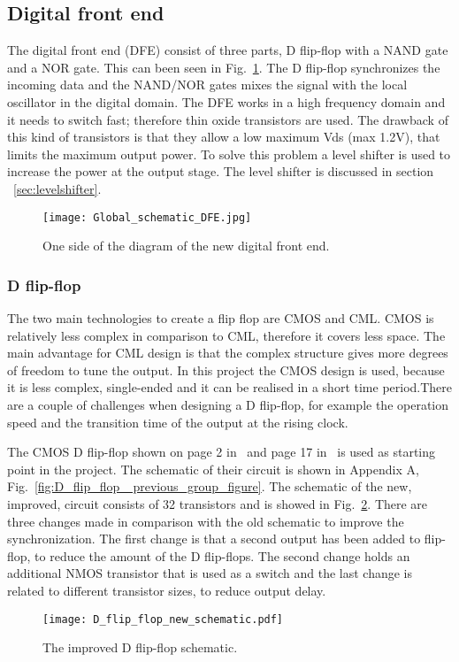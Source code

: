 \makeatletter
\newcommand*{\textoverline}[1]{$\overline{\hbox{#1}}\m@th$}
\makeatother

\subsection{Digital front end}\label{sec:frontend}
The digital front end (DFE) consist of three parts, D flip-flop with a NAND gate and a NOR gate. This can been seen in Fig.~\ref{fig:Global_schematic_DFE_figure}. The D flip-flop synchronizes the incoming data and the NAND/NOR gates mixes the signal with the local oscillator in the digital domain. The DFE works in a high frequency domain and it needs to switch fast; therefore thin oxide transistors are used. The drawback of this kind of transistors is that they allow a low maximum Vds (max 1.2V), that limits the maximum output power. To solve this problem a level shifter is used to increase the power at the output stage. The level shifter is discussed in section ~\ref{sec:levelshifter}. 

\begin{figure}[h]
\texttt{[image: Global\_schematic\_DFE.jpg]}
\caption{One side of the diagram of the new digital front end.}
\label{fig:Global_schematic_DFE_figure}
\end{figure}

\subsubsection{D flip-flop}\label{sec:frontend}
The two main technologies to create a flip flop are CMOS and CML. CMOS is relatively less complex in comparison to CML, therefore it covers less space. The main advantage for CML design is that the complex structure gives more degrees of freedom to tune the output. In this project the CMOS design is used, because it is less complex, single-ended and it can be realised in a short time period.There are a couple of challenges when designing a D flip-flop, for example the operation speed and the transition time of the output at the rising clock.

The CMOS D flip-flop shown on page 2 in~\cite{powerdac} and page 17 in~\cite{coursebook} is used as starting point in the project. The schematic of their circuit is shown in Appendix A, Fig.~\ref{fig:D_flip_flop_ previous_group_figure}. The schematic of the new, improved, circuit consists of 32 transistors and is showed in Fig.~\ref{fig:D_flip_flop_schematic_figure}. There are three changes made in comparison with the old schematic to improve the synchronization. The first change is that a second output has been added to flip-flop, to reduce the amount of the D flip-flops. The second change holds an additional NMOS transistor that is used as a switch and the last change is related to different transistor sizes, to reduce output delay.
\begin{figure}[h]
\texttt{[image: D\_flip\_flop\_new\_schematic.pdf]}
\caption{The improved D flip-flop schematic.}
\label{fig:D_flip_flop_schematic_figure}
\end{figure}

